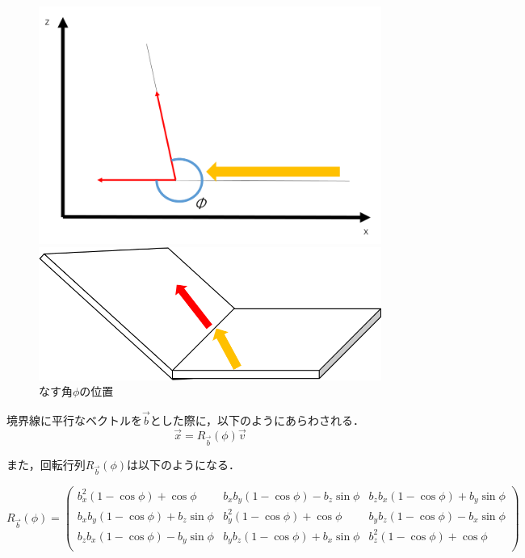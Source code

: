\documentclass[a4paper,11pt]{jarticle}
\begin{document}
	\begin{figure}
		
		\begin{minipage}{0.5\linewidth}
			\centering
			\includegraphics[width=1\linewidth]{png/rotation.png}
		\end{minipage}
		\begin{minipage}{0.5\linewidth}
			\centering
			\includegraphics[width=1\linewidth]{png/sub.png}
		\end{minipage}
		\caption{なす角$\phi$の位置}
		\label{fig:rotation}
	\end{figure}
	
	境界線に平行なベクトルを$\vec{b} $とした際に，以下のようにあらわされる．
	\begin{equation}
	\vec{x} = R_{\vec{b}}(\phi)\vec{v}
	\end{equation}
	
	また，回転行列$R_{\vec{b}}(\phi)$は以下のようになる．
	
	\begin{equation}
	R_{\vec{b}}(\phi)=\left( \begin{array}{ccc}
	b_x^2(1-\cos\phi)+\cos\phi & b_x b_y (1-\cos\phi) - b_z\sin\phi & b_z b_x (1-\cos\phi) + b_y\sin\phi \\
	b_x b_y (1-\cos\phi)+b_z \sin\phi & b_y^2 (1-\cos\phi) + \cos\phi & b_y b_z (1-\cos\phi) - b_x\sin\phi \\
	b_z b_x (1-\cos\phi)- b_y\sin\phi & b_y b_z (1-\cos\phi) + b_x \sin\phi & b_z^2 (1-\cos\phi) + \cos\phi \\
	\end{array} \right)
	\end{equation}
	
\end{document}
